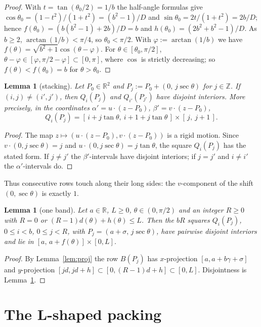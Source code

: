 \documentclass[11pt]{amsart}
\newcommand{\R}{\mathbb R}
\newcommand{\Z}{\mathbb Z}
\newtheorem{lemma}[theorem]{Lemma}
\theoremstyle{definition}
\theoremstyle{remark}
\numberwithin{equation}{section}
\begin{document}
\begin{proof}
With $t=\tan(\theta_0/2)=1/b$ the half-angle formulas give $\cos\theta_0=(1-t^2)/(1+t^2)=(b^2-1)/D$ and
$\sin\theta_0=2t/(1+t^2)=2b/D$; hence $f(\theta_0)=(b(b^2-1)+2b)/D=b$ and $h(\theta_0)=(2b^2+b^2-1)/D$. As $b\ge2$,
$\arctan(1/b)<\pi/4$, so $\theta_0<\pi/2$. With $\varphi:=\arctan(1/b)$ we have $f(\theta)=\sqrt{b^2+1}\cos(\theta-\varphi)$.
For $\theta\in[\theta_0,\pi/2]$, $\theta-\varphi\in[\varphi,\pi/2-\varphi]\subset[0,\pi]$, where $\cos$ is strictly
decreasing; so $f(\theta)<f(\theta_0)=b$ for $\theta>\theta_0$.
\end{proof}

\begin{lemma}[stacking]\label{lem:stack}
Let $P_0\in\R^2$ and $P_j:=P_0+(0,\,j\sec\theta)$ for $j\in\Z$. If $(i,j)\ne(i',j')$, then $Q_i(P_j)$ and
$Q_{i'}(P_{j'})$ have disjoint interiors. More precisely, in the coordinates $\alpha'=u\cdot(z-P_0)$,
$\beta'=v\cdot(z-P_0)$,
\[
Q_i(P_j)=[\,i+j\tan\theta,\ i+1+j\tan\theta\,]\times[\,j,\ j+1\,].
\]
\end{lemma}

\begin{proof}
The map $z\mapsto(u\cdot(z-P_0),v\cdot(z-P_0))$ is a rigid motion. Since $v\cdot(0,j\sec\theta)=j$ and
$u\cdot(0,j\sec\theta)=j\tan\theta$, the square $Q_i(P_j)$ has the stated form. If $j\ne j'$ the $\beta'$-intervals have
disjoint interiors; if $j=j'$ and $i\ne i'$ the $\alpha'$-intervals do.
\end{proof}

Thus consecutive rows touch along their long sides: the $v$-component of the shift $(0,\sec\theta)$ is exactly $1$.

\begin{lemma}[one band]\label{lem:band}
Let $a\in\R$, $L\ge0$, $\theta\in(0,\pi/2)$ and an integer $R\ge0$ with $R=0$ or $(R-1)d(\theta)+h(\theta)\le L$. Then the
$bR$ squares $Q_i(P_j)$, $0\le i<b$, $0\le j<R$, with $P_j=(a+\sigma,\,j\sec\theta)$, have pairwise disjoint interiors
and lie in $[a,\,a+f(\theta)]\times[0,L]$.
\end{lemma}

\begin{proof}
By Lemma~\ref{lem:proj} the row $B(P_j)$ has $x$-projection $[a,a+b\gamma+\sigma]$ and $y$-projection
$[jd,jd+h]\subset[0,(R-1)d+h]\subset[0,L]$. Disjointness is Lemma~\ref{lem:stack}.
\end{proof}

\section{The L-shaped packing}\label{sec:lshape}
\end{document}
